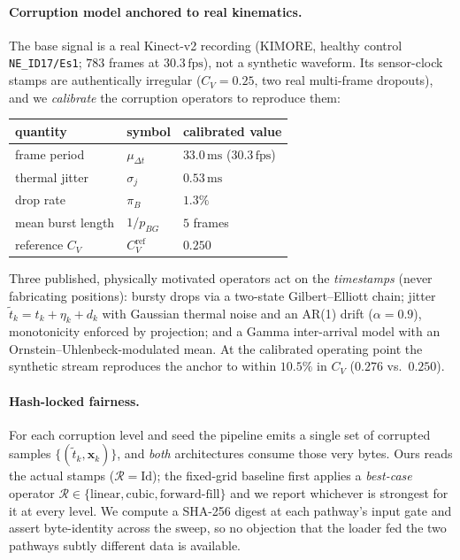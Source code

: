 \paragraph{Corruption model anchored to real kinematics.}
The base signal is a real Kinect-v2 recording (KIMORE, healthy control \texttt{NE\_ID17/Es1}; $783$
frames at $30.3\,\mathrm{fps}$), not a synthetic waveform. Its sensor-clock stamps are authentically
irregular ($C_V=0.25$, two real multi-frame dropouts), and we \emph{calibrate} the corruption
operators to reproduce them:
%
\begin{center}\small
\begin{tabular}{lll}
\hline
quantity & symbol & calibrated value \\ \hline
frame period      & $\mu_{\Delta t}$ & $33.0\,\mathrm{ms}$ ($30.3\,\mathrm{fps}$)\\
thermal jitter    & $\sigma_j$       & $0.53\,\mathrm{ms}$ \\
drop rate         & $\pi_B$          & $1.3\%$ \\
mean burst length & $1/p_{BG}$       & $5$ frames \\
reference $C_V$   & $C_V^{\mathrm{ref}}$ & $0.250$ \\ \hline
\end{tabular}
\end{center}
%
Three published, physically motivated operators act on the \emph{timestamps} (never fabricating
positions): bursty drops via a two-state Gilbert--Elliott chain; jitter
$\tilde t_k=t_k+\eta_k+d_k$ with Gaussian thermal noise and an AR(1) drift ($\alpha=0.9$),
monotonicity enforced by projection; and a Gamma inter-arrival model with an
Ornstein--Uhlenbeck-modulated mean. At the calibrated operating point the synthetic stream reproduces
the anchor to within $10.5\%$ in $C_V$ ($0.276$ vs.\ $0.250$).

\paragraph{Hash-locked fairness.}
For each corruption level and seed the pipeline emits a single set of corrupted samples
$\{(\tilde t_k,\bm{x}_k)\}$, and \emph{both} architectures consume those very bytes. Ours reads the
actual stamps ($\mathcal{R}=\mathrm{Id}$); the fixed-grid baseline first applies a \emph{best-case}
operator $\mathcal{R}\in\{\text{linear},\text{cubic},\text{forward-fill}\}$ and we report whichever is
strongest for it at every level. We compute a SHA-256 digest at each pathway's input gate and assert
byte-identity across the sweep, so no objection that the loader fed the two pathways subtly different
data is available.

